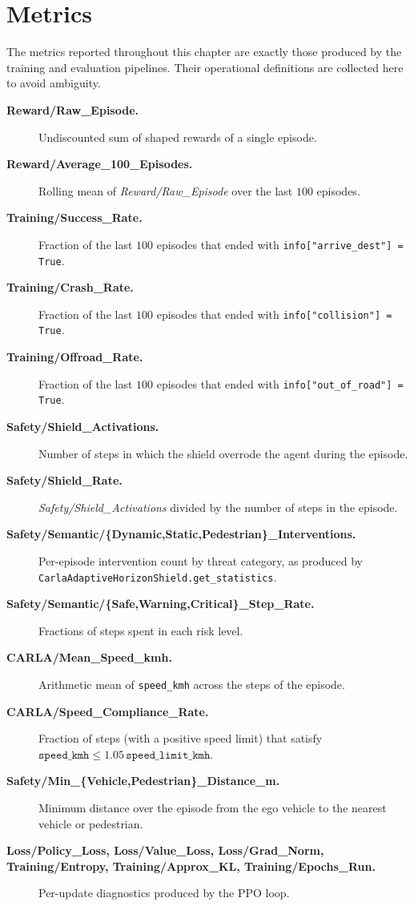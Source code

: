 \section{Metrics}\label{sec:exp-metrics}

The metrics reported throughout this chapter are exactly those produced by the training and
evaluation pipelines. Their operational definitions are collected here to avoid ambiguity.

\begin{description}
  \item[\textbf{Reward/Raw\_Episode.}] Undiscounted sum of shaped rewards of a single episode.
  \item[\textbf{Reward/Average\_100\_Episodes.}] Rolling mean of \emph{Reward/Raw\_Episode} over
        the last \(100\) episodes.
  \item[\textbf{Training/Success\_Rate.}] Fraction of the last \(100\) episodes that ended with
        \texttt{info["arrive\_dest"] = True}.
  \item[\textbf{Training/Crash\_Rate.}] Fraction of the last \(100\) episodes that ended with
        \texttt{info["collision"] = True}.
  \item[\textbf{Training/Offroad\_Rate.}] Fraction of the last \(100\) episodes that ended with
        \texttt{info["out\_of\_road"] = True}.
  \item[\textbf{Safety/Shield\_Activations.}] Number of steps in which the shield overrode the
        agent during the episode.
  \item[\textbf{Safety/Shield\_Rate.}] \emph{Safety/Shield\_Activations} divided by the number of
        steps in the episode.
  \item[\textbf{Safety/Semantic/\{Dynamic,Static,Pedestrian\}\_Interventions.}] Per-episode
        intervention count by threat category, as produced by
        \texttt{CarlaAdaptiveHorizonShield.get\_statistics}.
  \item[\textbf{Safety/Semantic/\{Safe,Warning,Critical\}\_Step\_Rate.}] Fractions of steps spent
        in each risk level.
  \item[\textbf{CARLA/Mean\_Speed\_kmh.}] Arithmetic mean of \texttt{speed\_kmh} across the steps
        of the episode.
  \item[\textbf{CARLA/Speed\_Compliance\_Rate.}] Fraction of steps (with a positive speed limit)
        that satisfy \(\texttt{speed\_kmh} \le 1.05\,\texttt{speed\_limit\_kmh}\).
  \item[\textbf{Safety/Min\_\{Vehicle,Pedestrian\}\_Distance\_m.}] Minimum distance over the
        episode from the ego vehicle to the nearest vehicle or pedestrian.
  \item[\textbf{Loss/Policy\_Loss, Loss/Value\_Loss, Loss/Grad\_Norm, Training/Entropy,
        Training/Approx\_KL, Training/Epochs\_Run.}] Per-update diagnostics produced by the PPO
        loop.
\end{description}

